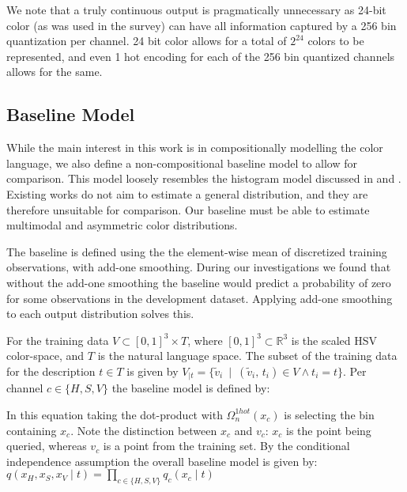 \documentclass[11pt,a4paper]{article}
\newcommand{\compactmath}[1]{\noindent\resizebox{\columnwidth}{!}{$#1$}}
\newcommand{\textcite}{\citet}
\begin{document}
We note that a truly continuous output is pragmatically unnecessary as 24-bit color (as was used in the survey) can have all information captured by a 256 bin quantization per channel.
24 bit color allows for a total of $2^{24}$ colors to be represented, and even 1 hot encoding for each of the 256 bin quantized channels allows for the same.


\subsection{Baseline Model}\label{sec:baseline-model}
While the main interest in this work is in compositionally modelling the color language,
we also define a non-compositional baseline model to allow for comparison.
This model loosely resembles the histogram model discussed in \textcite{meomcmahanstone:color} and \textcite{mcmahan2015bayesian}.
Existing works do not aim to estimate a general distribution, and they are therefore unsuitable for comparison.
Our baseline must be able to estimate multimodal and asymmetric color distributions.

The baseline is defined using the the element-wise mean of discretized  training observations, with add-one smoothing.
During our investigations we found that without the add-one smoothing the baseline would predict a probability of zero for some observations in the development dataset.
Applying add-one smoothing to each output distribution solves this.

For the training data $V \subset \left[ 0,1 \right] ^{3}\times T$, where $\left[ 0,1 \right] ^{3} \subset \mathbb{R}^{3}$ is the scaled HSV color-space, and $T$ is the natural language space.
The subset of the training data for the description $t \in T$ is given by
$V_{|t}=\{\tilde{v}_i \: \mid \: (\tilde{v}_i,\,t_i) \in V \wedge t_{i}=t\}$.
Per channel $c\in \lbrace H,S,V\rbrace$ the baseline model is defined by: 

\compactmath{
	q_{c}(x_{c}\mid t)=\frac{\displaystyle
		\sum_{\mathrlap{\!\!\!\!\!\!
				\forall(v_{H},v_{S},v_{V})\in V_{|t}}}
			\Omega_n^{blur}(v_{c},\mathcal{D}_c,\sigma)
			\cdot
			\Omega_n^{1hot}(x_{c})		
			+1}
		{\displaystyle \left|V_{|t}\right|+n}
}
%
In this equation taking the dot-product with $\Omega_n^{1hot}(x_{c})$ is selecting the bin containing $x_c$.
Note the distinction between $x_c$ and $v_c$: $x_c$ is the point being queried, whereas $v_c$ is a point from the training set.
By the conditional independence assumption the overall baseline model is given by: $q(x_H,x_S,x_V\mid t) = \prod_{c\in {\{H,S,V\}}} q_c(x_c\mid t)$
\end{document}
